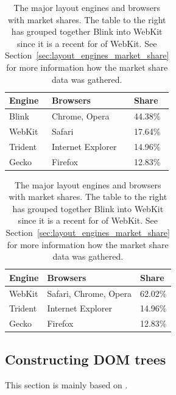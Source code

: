 \documentclass[a4paper,11pt]{kth-mag}
\begin{document}
        \begin{table}[ht]\center
          \tiny
          \begin{minipage}[t]{0.38\linewidth}
            \begin{tabular}[t]{ l l l }
              \textbf{Engine} & \textbf{Browsers} & \textbf{Share} \\
              \hline
              Blink & Chrome, Opera & 44.38\% \\
              WebKit & Safari & 17.64\% \\
              Trident & Internet Explorer & 14.96\% \\
              Gecko & Firefox & 12.83\% \\
            \end{tabular}
          \end{minipage}
          \hspace{0.1cm}
          \begin{minipage}[t]{0.42\linewidth}
            \begin{tabular}[t]{ l l l }
              \textbf{Engine} & \textbf{Browsers} & \textbf{Share} \\
              \hline
              WebKit & Safari, Chrome, Opera & 62.02\% \\
              Trident & Internet Explorer & 14.96\% \\
              Gecko & Firefox & 12.83\% \\
            \end{tabular}
          \end{minipage}
          \caption{
            The major \glspl{layout engine} and \glspl{browser} with market shares.
            The table to the right has grouped together Blink into \gls{WebKit} since it is a recent for of \gls{WebKit}.
            See Section~\ref{sec:layout_engines_market_share} for more information how the market share data was gathered.}
          \label{table:layout_engines}
        \end{table}


      \subsection{Constructing DOM trees}\label{sec:dom-tree}
        This section is mainly based on .
\end{document}
